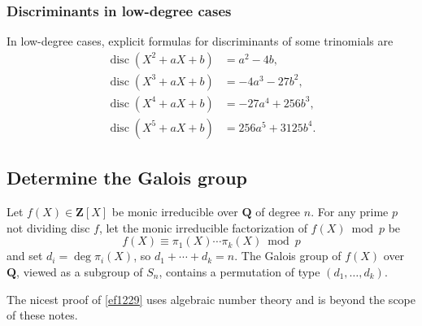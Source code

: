 \subsubsection{Discriminants in low-degree cases}

In low-degree cases, explicit formulas for discriminants of some trinomials are
\[
\begin{aligned}
\operatorname{disc}\left(X^2+a X+b\right) & =a^2-4 b, \\
\operatorname{disc}\left(X^3+a X+b\right) & =-4 a^3-27 b^2, \\
\operatorname{disc}\left(X^4+a X+b\right) & =-27 a^4+256 b^3, \\
\operatorname{disc}\left(X^5+a X+b\right) & =256 a^5+3125 b^4 .
\end{aligned}
\]
\subsection{Determine the Galois group}

\begin{theorem}[Dedekind]
Let $f(X) \in \mathbf{Z}[X]$ be monic irreducible over $\mathbf{Q}$ of degree $n$. For any prime $p$ not dividing disc $f$, let the monic irreducible factorization of $f(X) \bmod p$ be
\[
f(X) \equiv \pi_1(X) \cdots \pi_k(X) \bmod p
\]and set $d_i=\operatorname{deg} \pi_i(X)$, so $d_1+\cdots+d_k=n$. The Galois group of $f(X)$ over $\mathbf{Q}$, viewed as a subgroup of $S_n$, contains a permutation of type $\left(d_1, \ldots, d_k\right)$.\label{ef1229}
\end{theorem}

The nicest proof of \cref{ef1229}  uses algebraic number theory and is beyond the scope of these notes.

